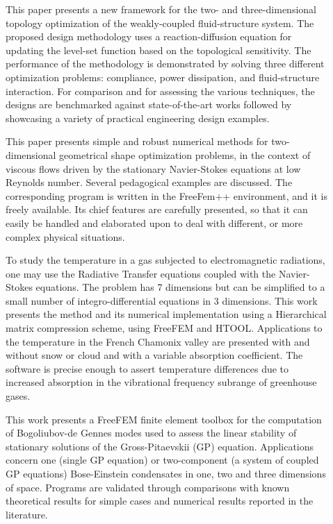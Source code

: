 \begin{description}
\item[] This paper presents a new framework for the two- and three-dimensional topology optimization of the weakly-coupled fluid-structure system. The proposed design methodology uses a reaction-diffusion equation for updating the level-set function based on the topological sensitivity. The performance of the methodology is demonstrated by solving three different optimization problems: compliance, power dissipation, and fluid-structure interaction. For comparison and for assessing the various techniques, the designs are benchmarked against state-of-the-art works followed by showcasing a variety of practical engineering design examples.

\item[] This paper presents simple and robust numerical methods for two-dimensional geometrical shape optimization problems, in the context of viscous flows driven by the stationary Navier-Stokes equations at low Reynolds number. Several pedagogical examples are discussed. The corresponding program is written in the FreeFem++ environment, and it is freely available. Its chief features are carefully presented, so that it can easily be handled and elaborated upon to deal with different, or more complex physical situations.

\item[] To study the temperature in a gas subjected to electromagnetic radiations, one may use the Radiative Transfer equations coupled with the Navier-Stokes equations. The problem has 7 dimensions but can be simplified to a small number of integro-differential equations in 3 dimensions. This work presents the method and its numerical implementation using a Hierarchical matrix compression scheme, using FreeFEM and HTOOL. Applications to the temperature in the French Chamonix valley are presented with and without snow or cloud and with a variable absorption coefficient. The software is precise enough to assert temperature differences due to increased absorption in the vibrational frequency subrange of greenhouse gases.

\item[] This work presents a FreeFEM finite element toolbox for the computation of Bogoliubov-de Gennes modes used to assess the linear stability of stationary solutions of the Gross-Pitaevskii (GP) equation. Applications concern one (single GP equation) or two-component (a system of coupled GP equations) Bose-Einstein condensates in one, two and three dimensions of space. Programs are validated through comparisons with known theoretical results for simple cases and numerical results reported in the literature.
\end{description}


